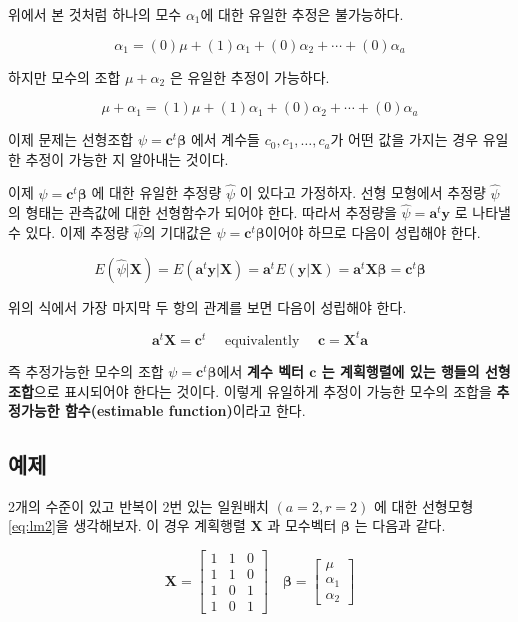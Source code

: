\documentclass[
  10pt,
]{book}
\theoremstyle{definition}
\theoremstyle{definition}
\theoremstyle{definition}
\theoremstyle{definition}
\theoremstyle{remark}
\begin{document}
위에서 본 것처럼 하나의 모수 \(\alpha_1\)에 대한 유일한 추정은 불가능하다.

\[  \alpha_1 = (0) \mu + (1) \alpha_1 + (0) \alpha_2 + \cdots + (0) \alpha_a \]

하지만 모수의 조합 \(\mu+ \alpha_2\) 은 유일한 추정이 가능하다.

\[  \mu + \alpha_1 = (1) \mu + (1) \alpha_1 + (0) \alpha_2 + \cdots + (0) \alpha_a \]

이제 문제는 선형조합 \(\psi= \bm c^t \bm \beta\) 에서 계수들 \(c_0, c_1, \dots, c_a\)가 어떤 값을 가지는 경우 유일한 추정이 가능한 지 알아내는 것이다.

이제 \(\psi = \bm c^t \bm \beta\) 에 대한 유일한 추정량 \(\hat \psi\) 이 있다고 가정하자. 선형 모형에서 추정량 \(\hat \psi\)의 형태는 관측값에 대한 선형함수가 되어야 한다. 따라서 추정량을 \(\hat \psi = \bm a^t \bm y\) 로 나타낼 수 있다. 이제 추정량 \(\hat \psi\)의 기대값은 \(\psi=\bm c^t \bm \beta\)이어야 하므로 다음이 성립해야 한다.

\[ E(\hat \psi| \bm X) = E(\bm a^t \bm y| \bm X) = \bm a^t E(\bm y| \bm X) = \bm a^t \bm X \bm \beta = \bm c^t \bm \beta \]

위의 식에서 가장 마지막 두 항의 관계를 보면 다음이 성립해야 한다.

\begin{equation}
\bm a^t \bm X = \bm c^t  \quad \text{ equivalently }\quad \bm c = \bm X^t \bm a
\label{eq:estimable}
\end{equation}

즉 추정가능한 모수의 조합 \(\psi = \bm c^t \bm \beta\)에서 \textbf{계수 벡터 \(\bm c\) 는 계획행렬에 있는 행들의 선형 조합}으로 표시되어야 한다는 것이다. 이렇게 유일하게 추정이 가능한
모수의 조합을 \textbf{추정가능한 함수(estimable function)}이라고 한다.

\hypertarget{uxc608uxc81c}{%
\subsection{예제}\label{uxc608uxc81c}}

2개의 수준이 있고 반복이 2번 있는 일원배치 \((a=2,r=2)\) 에 대한 선형모형 \eqref{eq:lm2}을 생각해보자. 이 경우 계획행렬 \(\bm X\) 과 모수벡터 \(\bm \beta\) 는 다음과 같다.

\begin{equation}
\bm X = 
\begin{bmatrix}
1 & 1 & 0  \\
1 & 1 & 0  \\
1 & 0 & 1  \\
1 & 0 & 1  
\end{bmatrix}
\quad 
\bm \beta = 
\begin{bmatrix}
\mu \\
\alpha_1 \\
\alpha_2 
\end{bmatrix}
\end{equation}
\end{document}
